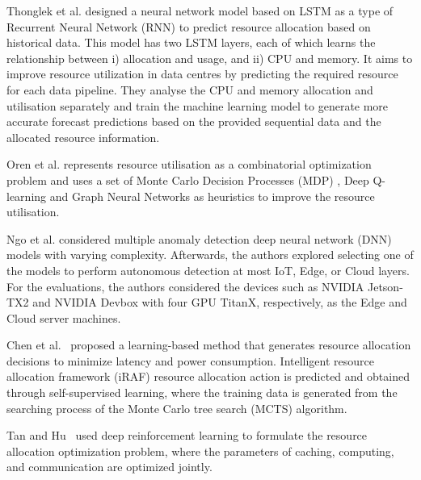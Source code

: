         Thonglek et al. \cite{thonglekImprovingResourceUtilization2019} designed a neural network model based on LSTM as a type of Recurrent Neural Network (RNN) to predict resource allocation based on historical data. This model has two LSTM layers, each of which learns the relationship between i) allocation and usage, and ii) CPU and memory. It aims to improve resource utilization in data centres by predicting the required resource for each data pipeline.
        They analyse the CPU and memory allocation and utilisation separately and train the machine learning model to generate more accurate forecast predictions based on the provided sequential data and the allocated resource information.
        
        Oren et al. \cite{orenSOLOSearchOnline2021} represents resource utilisation as a combinatorial optimization problem and uses a set of Monte Carlo Decision Processes (MDP) \cite{jamesMonteCarloTheory1980}, Deep Q-learning and Graph Neural Networks as heuristics to improve the resource utilisation.

        Ngo et al. \cite{ngoContextualbanditAnomalyDetection2020} considered multiple anomaly detection deep neural network (DNN) models with varying complexity. Afterwards, the authors explored selecting one of the models to perform autonomous detection at most IoT, Edge, or Cloud layers. For the evaluations, the authors considered the devices such as NVIDIA Jetson-TX2 and NVIDIA Devbox with four GPU TitanX, respectively, as the Edge and Cloud server machines.

        Chen et al.~\cite{chenIRAFDeepReinforcement2019,chenIntelligentTaskOffloading2020} proposed a learning-based method that generates resource allocation decisions to minimize latency and power consumption. Intelligent resource allocation framework (iRAF) resource allocation action is predicted and obtained through self-supervised learning, where the training data is generated from the searching process of the Monte Carlo tree search (MCTS) algorithm.

        Tan and Hu~\cite{huMobilityawareEdgeCaching2018} used deep reinforcement learning to formulate the resource allocation optimization problem, where the parameters of caching, computing, and communication are optimized jointly.
